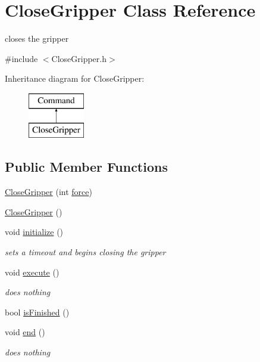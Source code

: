 \hypertarget{classCloseGripper}{\section{Close\-Gripper Class Reference}
\label{classCloseGripper}
}


closes the gripper  




{\ttfamily \#include $<$Close\-Gripper.\-h$>$}

Inheritance diagram for Close\-Gripper\-:\begin{figure}[H]
\begin{center}
\leavevmode
\includegraphics[height=2.000000cm]{classCloseGripper}
\end{center}
\end{figure}
\subsection*{Public Member Functions}
\begin{DoxyCompactItemize}
\item 
\hyperlink{classCloseGripper_a64f2e7352ab7dfc8217760d8fc882b13}{Close\-Gripper} (int \hyperlink{classCloseGripper_ac90b3c4ad2ba86181bdfa5a3f926593c}{force})
\item 
\hyperlink{classCloseGripper_ac95731a5048d22a12eb77f85fa4f254a}{Close\-Gripper} ()
\item 
void \hyperlink{classCloseGripper_a91b194b7afe5bdc70ccb97fb6a77e956}{initialize} ()
\begin{DoxyCompactList}\small\item\em sets a timeout and begins closing the gripper \end{DoxyCompactList}\item 
void \hyperlink{classCloseGripper_a11b489ca1de2f1be5cb82f47345360d8}{execute} ()
\begin{DoxyCompactList}\small\item\em does nothing \end{DoxyCompactList}\item 
bool \hyperlink{classCloseGripper_afab2b93b62904d6fd70a794a9f954abf}{is\-Finished} ()
\item 
void \hyperlink{classCloseGripper_a06ab30ca6e30278ab74e973e268c5d97}{end} ()
\begin{DoxyCompactList}\small\item\em does nothing \end{DoxyCompactList}\end{DoxyCompactItemize}
